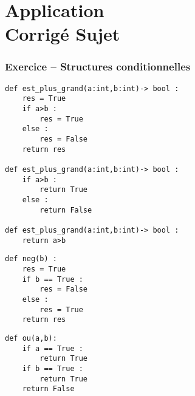 \chapter*{Application  \\ 
\ifprof Corrigé \else Sujet \fi}

\iflivret {} \else
\ifprof  {} \else \fi
\fi

\setcounter{question}{0}





\subsection*{Exercice -- Structures conditionnelles}

\ifprof
\begin{corrige}
\begin{lstlisting}
def est_plus_grand(a:int,b:int)-> bool : 
    res = True
    if a>b : 
        res = True
    else :
        res = False
    return res

def est_plus_grand(a:int,b:int)-> bool : 
    if a>b : 
        return True
    else :
        return False

def est_plus_grand(a:int,b:int)-> bool : 
    return a>b
\end{lstlisting}
\end{corrige}
\else
\fi
{}
\ifprof
\begin{corrige}
\begin{lstlisting}
def neg(b) :
    res = True
    if b == True :
        res = False
    else : 
        res = True
    return res
\end{lstlisting}
\end{corrige}
\else
\fi

\ifprof
\begin{corrige}
\begin{lstlisting}
def ou(a,b):
    if a == True :
        return True
    if b == True :
        return True
    return False
\end{lstlisting}
\end{corrige}
\else
\fi

